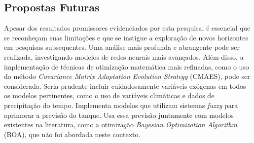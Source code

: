 \subsection{Propostas Futuras}

Apesar dos resultados promissores evidenciados por esta pesquisa, é essencial que se reconheçam suas limitações e que se instigue a exploração de novos horizontes em pesquisas subsequentes. Uma análise mais profunda e abrangente pode ser realizada, investigando modelos de redes neurais mais avançados. Além disso, a implementação de técnicas de otimização matemática mais refinadas, como o uso do método \textit{Covariance Matrix Adaptation Evolution Strategy} (CMAES), pode ser considerada. Seria prudente incluir cuidadosamente variáveis exógenas em todos os modelos pertinentes, como o uso de variáveis climáticas e dados de precipitação do tempo.
Implementa modelos que utilizam sistemas \textit{fuzzy} para aprimorar a previsão do tanque. Usa essa previsão juntamente com modelos existentes na literatura, como a otimização \textit{Bayesian Optimization Algorithm} (BOA), que não foi abordada neste contexto.


